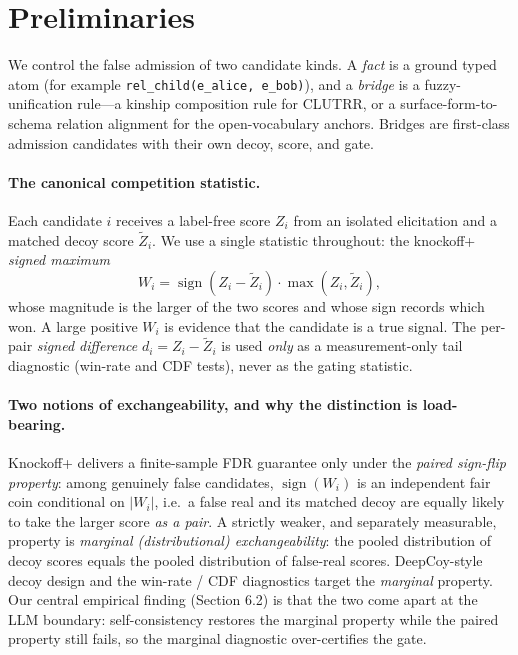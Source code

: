 \documentclass[11pt,letterpaper]{article}
\begin{document}
\section{Preliminaries}

We control the false admission of two candidate kinds. A \emph{fact} is a ground typed atom (for example \texttt{rel\_child(e\_alice, e\_bob)}), and a \emph{bridge} is a fuzzy-unification rule---a kinship composition rule for CLUTRR, or a surface-form-to-schema relation alignment for the open-vocabulary anchors. Bridges are first-class admission candidates with their own decoy, score, and gate.

\paragraph{The canonical competition statistic.} Each candidate $i$ receives a label-free score $Z_i$ from an isolated elicitation and a matched decoy score $\tilde{Z}_i$. We use a single statistic throughout: the knockoff+ \emph{signed maximum}
$$W_i = \operatorname{sign}(Z_i - \tilde{Z}_i)\cdot\max(Z_i, \tilde{Z}_i),$$
whose magnitude is the larger of the two scores and whose sign records which won. A large positive $W_i$ is evidence that the candidate is a true signal. The per-pair \emph{signed difference} $d_i = Z_i - \tilde{Z}_i$ is used \emph{only} as a measurement-only tail diagnostic (win-rate and CDF tests), never as the gating statistic.

\paragraph{Two notions of exchangeability, and why the distinction is load-bearing.} Knockoff+ delivers a finite-sample FDR guarantee only under the \emph{paired sign-flip property}: among genuinely false candidates, $\operatorname{sign}(W_i)$ is an independent fair coin conditional on $|W_i|$, i.e.\ a false real and its matched decoy are equally likely to take the larger score \emph{as a pair}. A strictly weaker, and separately measurable, property is \emph{marginal (distributional) exchangeability}: the pooled distribution of decoy scores equals the pooled distribution of false-real scores. DeepCoy-style decoy design \cite{Imrie2020} and the win-rate / CDF diagnostics target the \emph{marginal} property. Our central empirical finding (Section 6.2) is that the two come apart at the LLM boundary: self-consistency restores the marginal property while the paired property still fails, so the marginal diagnostic over-certifies the gate.
\end{document}
